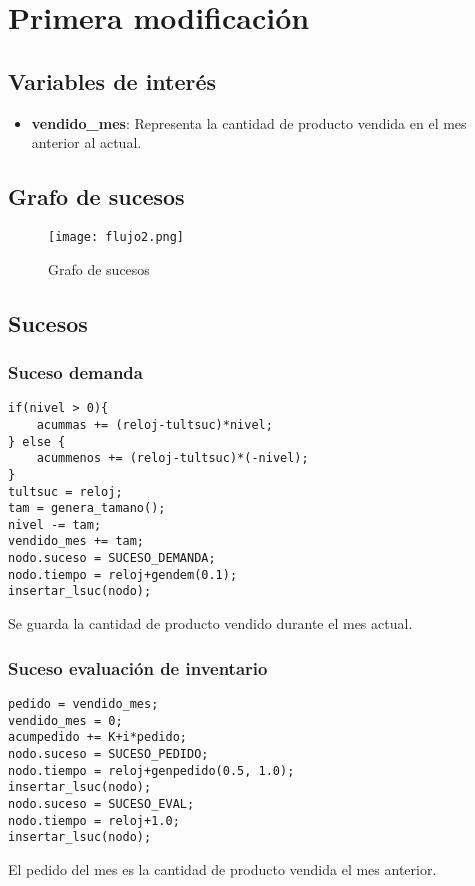 \section{Primera modificación}
\subsection{Variables de interés}
\begin{itemize}
	\item \textbf{vendido\_mes}: Representa la cantidad de producto vendida en el mes anterior al actual.
\end{itemize}
\subsection{Grafo de sucesos}
\begin{figure}[H]
	\centering
	\texttt{[image: flujo2.png]}
	\caption{Grafo de sucesos}
\end{figure}

\subsection{Sucesos}
\subsubsection{Suceso demanda}

\begin{verbatim}
if(nivel > 0){
	acummas += (reloj-tultsuc)*nivel;
} else {
	acummenos += (reloj-tultsuc)*(-nivel);
}
tultsuc = reloj;
tam = genera_tamano();
nivel -= tam;
vendido_mes += tam;
nodo.suceso = SUCESO_DEMANDA;
nodo.tiempo = reloj+gendem(0.1);
insertar_lsuc(nodo);
\end{verbatim}
Se guarda la cantidad de producto vendido durante el mes actual.

\newpage

\subsubsection{Suceso evaluación de inventario}
\begin{verbatim}
pedido = vendido_mes;
vendido_mes = 0;
acumpedido += K+i*pedido;
nodo.suceso = SUCESO_PEDIDO;
nodo.tiempo = reloj+genpedido(0.5, 1.0);
insertar_lsuc(nodo);
nodo.suceso = SUCESO_EVAL;
nodo.tiempo = reloj+1.0;
insertar_lsuc(nodo);
\end{verbatim}
El pedido del mes es la cantidad de producto vendida el mes anterior.


